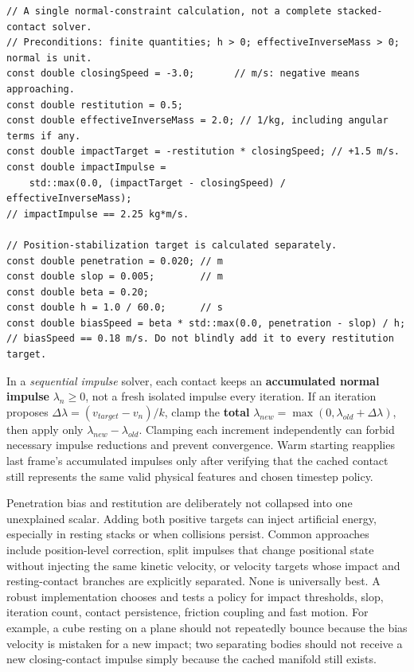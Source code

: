 \begin{verbatim}
// A single normal-constraint calculation, not a complete stacked-contact solver.
// Preconditions: finite quantities; h > 0; effectiveInverseMass > 0; normal is unit.
const double closingSpeed = -3.0;       // m/s: negative means approaching.
const double restitution = 0.5;
const double effectiveInverseMass = 2.0; // 1/kg, including angular terms if any.
const double impactTarget = -restitution * closingSpeed; // +1.5 m/s.
const double impactImpulse =
    std::max(0.0, (impactTarget - closingSpeed) / effectiveInverseMass);
// impactImpulse == 2.25 kg*m/s.

// Position-stabilization target is calculated separately.
const double penetration = 0.020; // m
const double slop = 0.005;        // m
const double beta = 0.20;
const double h = 1.0 / 60.0;      // s
const double biasSpeed = beta * std::max(0.0, penetration - slop) / h;
// biasSpeed == 0.18 m/s. Do not blindly add it to every restitution target.
\end{verbatim}

In a \emph{sequential impulse} solver, each contact keeps an \textbf{accumulated normal impulse} \(\lambda_n\geq0\), not a fresh isolated impulse every iteration. If an iteration proposes \(\Delta\lambda=(v_{target}-v_n)/k\), clamp the \textbf{total} \(\lambda_{new}=\max(0,\lambda_{old}+\Delta\lambda)\), then apply only \(\lambda_{new}-\lambda_{old}\). Clamping each increment independently can forbid necessary impulse reductions and prevent convergence. Warm starting reapplies last frame's accumulated impulses only after verifying that the cached contact still represents the same valid physical features and chosen timestep policy.

Penetration bias and restitution are deliberately not collapsed into one unexplained scalar. Adding both positive targets can inject artificial energy, especially in resting stacks or when collisions persist. Common approaches include position-level correction, split impulses that change positional state without injecting the same kinetic velocity, or velocity targets whose impact and resting-contact branches are explicitly separated. None is universally best. A robust implementation chooses and tests a policy for impact thresholds, slop, iteration count, contact persistence, friction coupling and fast motion. For example, a cube resting on a plane should not repeatedly bounce because the bias velocity is mistaken for a new impact; two separating bodies should not receive a new closing-contact impulse simply because the cached manifold still exists.


